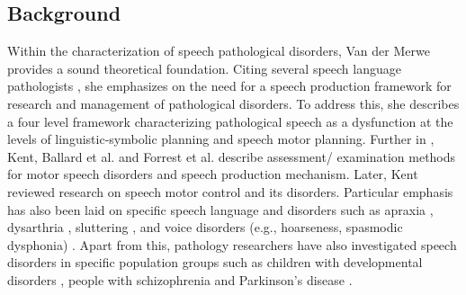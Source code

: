 \documentclass{article}
\begin{document}
\subsection{Background}
Within the characterization of speech pathological disorders, Van der Merwe \cite{van1997characterization,mcneil2009clinical} provides a sound theoretical foundation. 
Citing several speech language pathologists \cite{mcneil1990motoric,kent1987relative,marquardt1984elusive}, she emphasizes on the need for a speech production framework for research and management of pathological disorders. 
To address this, she describes a four level framework characterizing pathological speech as a dysfunction at the levels of linguistic-symbolic planning and speech motor planning. 
Further in \cite{mcneil2009clinical}, Kent, Ballard et al. and Forrest et al. describe assessment/ examination methods for motor speech disorders and speech production mechanism. 
Later, Kent \cite{kent2000research} reviewed research on speech motor control and its disorders.
Particular emphasis has also been laid on specific speech language and disorders such as apraxia \cite{wambaugh2002summary}, dysarthria \cite{yorkston2007evidence}, sluttering \cite{bothe2006stuttering}, and voice disorders (e.g., hoarseness, spasmodic dysphonia) \cite{aronson2011clinical}. 
Apart from this, pathology researchers have also investigated speech disorders in specific population groups such as children with developmental disorders \cite{millar2006impact,schlosser2008effects}, people with schizophrenia \cite{delisi2001speech} and Parkinson's disease \cite{critchley1981speech}.
\end{document}
